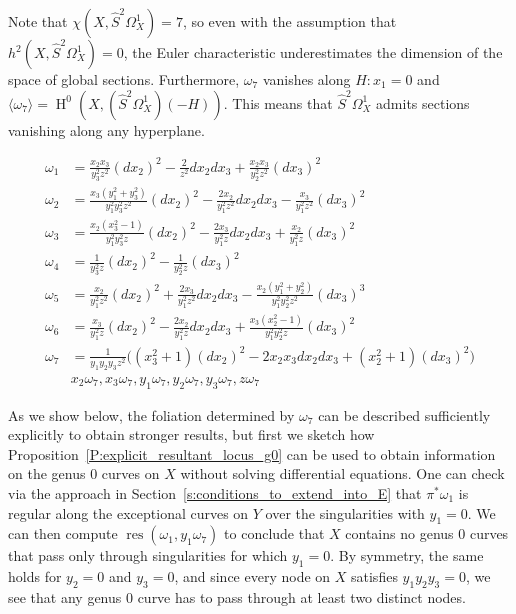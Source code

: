 \documentclass[12pt, reqno]{amsart}
\theoremstyle{definition}
\DeclareMathOperator{\HH}{H}
\DeclareMathOperator{\res}{res}
\numberwithin{equation}{section}
\numberwithin{table}{section}
\begin{document}
Note that $\chi(X,\hat{S}^2\Omega^1_X)=7$, so even with the assumption that $h^2(X,\hat{S}^2\Omega^1_X)=0$, the Euler characteristic underestimates the dimension of the space of global sections. Furthermore, $\omega_7$ vanishes along $H\colon x_1=0$ and $\langle\omega_7\rangle=\HH^0(X,(\hat{S}^2\Omega^1_X)(-H))$. This means that $\hat{S}^2\Omega^1_X$ admits sections vanishing along any hyperplane. 
\begin{table}
\[\begin{aligned}
\omega_1&=\frac{x_2x_3}{y_3^2z^2} (dx_2)^2-\frac{2}{z^2}dx_2dx_3+\frac{x_2x_3}{y_2^2z^2}(dx_3)^2\\
\omega_2&=\frac{x_3(y_1^2+y_3^2)}{y_1^2y_3^2z^2}(dx_2)^2-\frac{2x_2}{y_1^2z^2}dx_2dx_3-\frac{x_3}{y_1^2z^2}(dx_3)^2\\
\omega_3&=\frac{x_2(x_3^2-1)}{y_1^2y_3^2z}(dx_2)^2-\frac{2x_3}{y_1^2z}dx_2dx_3+\frac{x_2}{y_1^2z}(dx_3)^2\\
\omega_4&=\frac{1}{y_3^2z}(dx_2)^2-\frac{1}{y_2^2z}(dx_3)^2\\
\omega_5&=\frac{x_2}{y_1^2z^2}(dx_2)^2+\frac{2x_3}{y_1^2z^2}dx_2dx_3-\frac{x_2(y_1^2+y_2^2)}{y_1^2y_2^2z^2}(dx_3)^3\\
\omega_6&=\frac{x_3}{y_1^2z}(dx_2)^2-\frac{2x_2}{y_1^2z}dx_2dx_3+\frac{x_3(x_2^2-1)}{y_1^2y_2^2z}(dx_3)^2\\
\omega_7&=\frac{1}{y_1y_2y_3z^2}\Big((x_3^2+1)(dx_2)^2-2x_2x_3dx_2dx_3+(x_2^2+1)(dx_3)^2\Big)\\
&x_2\omega_7,x_3\omega_7,y_1\omega_7,y_2\omega_7,y_3\omega_7,z\omega_7
\end{aligned}\]
\caption{Generators for $\HH^0(X,\hat{S}^2\Omega^1_X)$; given on affine patch $x_1=1$}
\label{tbl:sym2gens}
\end{table}

As we show below, the foliation determined by $\omega_7$ can be described sufficiently explicitly to obtain stronger results, but first we sketch how Proposition~\ref{P:explicit_resultant_locus_g0} can be used to obtain information on the genus $0$ curves on $X$ without solving differential equations. One can check via the approach in Section~\ref{s:conditions_to_extend_into_E} that $\pi^*\omega_1$ is regular along the exceptional curves on $Y$ over the singularities with $y_1=0$. We can then compute $\res(\omega_1,y_1\omega_7)$ to conclude that $X$ contains no genus $0$ curves that pass only through singularities for which $y_1=0$. By symmetry, the same holds for $y_2=0$ and $y_3=0$, and since every node on $X$ satisfies $y_1y_2y_3=0$, we see that any genus $0$ curve has to pass through at least two distinct nodes.
\end{document}
